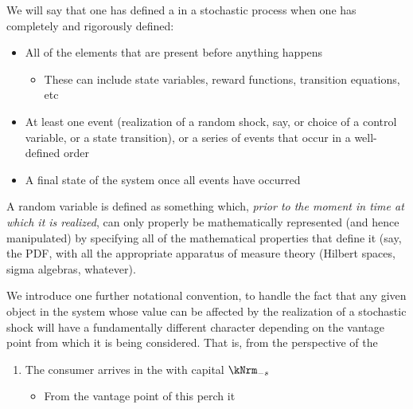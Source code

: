 \documentclass[\econtexRoot/BufferStockTheory]{subfiles}
\begin{document}
We will say that one has defined a {\stge} in a stochastic process when one has completely and rigorously defined:
\begin{itemize}
\item All of the elements that are present before anything happens
  \begin{itemize}
  \item These can include state variables, reward functions, transition equations, etc
  \end{itemize}
\item At least one event (realization of a random shock, say, or choice of a control variable, or a state transition), or a series of events that occur in a well-defined order
  \item A final state of the system once all events have occurred
\end{itemize}

A random variable is defined as something which, \textit{prior to the moment in time at which it is realized}, can only properly be mathematically represented (and hence manipulated) by specifying all of the mathematical properties that define it  (say, the PDF, with all the appropriate apparatus of measure theory (Hilbert spaces, sigma algebras, whatever).


We introduce one further notational convention, to handle the fact that any given object in the system whose value can be affected by the realization of a stochastic shock will have a fundamentally different character depending on the vantage point from which it is being considered.
That is, from the perspective of the 

\begin{enumerate}
\item The consumer arrives in the {\stge} with capital $\kNrm_{-\tnow}$
  \begin{itemize}
    \item From the vantage point of this perch it 
    \end{itemize}
  \end{enumerate}
\end{document}
